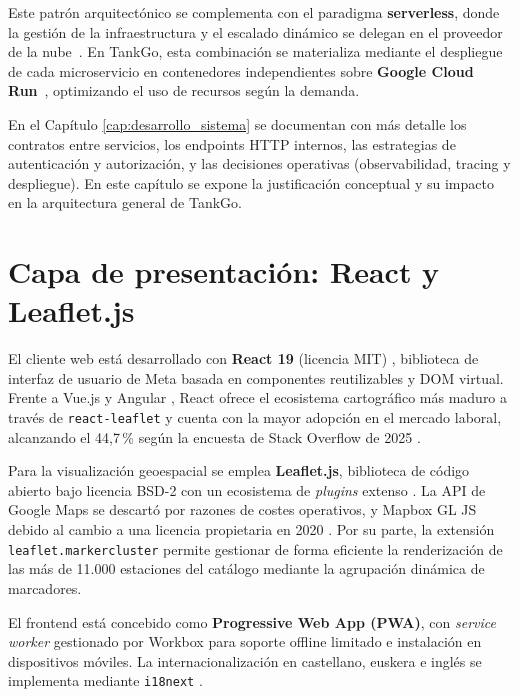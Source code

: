 Este patrón arquitectónico se complementa con el paradigma \textbf{serverless}, donde la gestión
de la infraestructura y el escalado dinámico se delegan en el proveedor de la nube~\cite{nist2011}.
En TankGo, esta combinación se materializa mediante el despliegue de cada microservicio en
contenedores independientes sobre \textbf{Google Cloud Run}~\cite{cloud_run2026}, optimizando
el uso de recursos según la demanda.

En el Capítulo \ref{cap:desarrollo_sistema} se documentan con más detalle los contratos entre servicios, los
endpoints HTTP internos, las estrategias de autenticación y autorización, y las
decisiones operativas (observabilidad, tracing y despliegue). En este capítulo se
expone la justificación conceptual y su impacto en la arquitectura general de TankGo.

\section{Capa de presentación: React y Leaflet.js}

El cliente web está desarrollado con \textbf{React 19} (licencia MIT) \cite{react}, biblioteca de
interfaz de usuario de Meta basada en componentes reutilizables y DOM virtual. Frente
a Vue.js y Angular \cite{vuejs, angular}, React ofrece el ecosistema cartográfico más
maduro a través de \texttt{react-leaflet} \cite{react_leaflet} y cuenta con la mayor
adopción en el mercado laboral, alcanzando el 44{,}7\,\% según la encuesta de Stack
Overflow de 2025 \cite{stackoverflow_survey_2025}.

Para la visualización geoespacial se emplea \textbf{Leaflet.js}, biblioteca de código
abierto bajo licencia BSD-2 con un ecosistema de \textit{plugins} extenso
\cite{logrocket_leaflet_guide}. La API de Google Maps se descartó por razones de costes
operativos, y Mapbox GL JS debido al cambio a una licencia propietaria en
2020 \cite{geoapify_map_comparison}. Por su parte, la extensión
\texttt{leaflet.markercluster} \cite{leaflet_markercluster} permite gestionar de forma
eficiente la renderización de las más de 11.000 estaciones del catálogo mediante la agrupación dinámica de marcadores.

El frontend está concebido como \textbf{Progressive Web App (PWA)}, con
\textit{service worker} gestionado por Workbox \cite{pwa_spec, mdn_service_workers,
    workbox} para soporte offline limitado e instalación en dispositivos móviles.
La internacionalización en castellano, euskera e inglés se implementa mediante
\texttt{i18next} \cite{i18next, react_i18next}.

